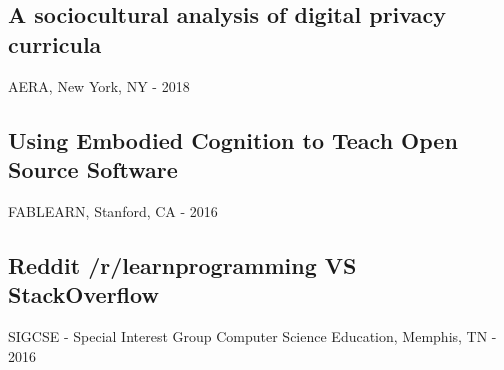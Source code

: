 \documentclass[../main.tex]{subfiles}
\begin{document}
\subsection*{A sociocultural analysis of digital privacy curricula}
     AERA, New York, NY - 2018
	\hfill

\subsection*{Using Embodied Cognition to Teach Open Source Software}
     FABLEARN, Stanford, CA - 2016
	\hfill

\subsection*{Reddit /r/learnprogramming VS StackOverflow}
     SIGCSE - Special Interest Group Computer Science Education, Memphis, TN - 2016
	\hfill
\end{document}
